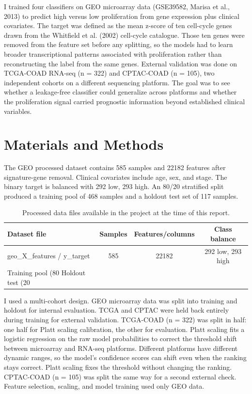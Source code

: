 \documentclass[11pt]{article}
\begin{document}
I trained four classifiers on GEO microarray data (GSE39582, Marisa et al., 2013) to predict high versus low proliferation from gene expression plus clinical covariates. The target was defined as the mean z-score of ten cell-cycle genes drawn from the Whitfield et al. (2002) cell-cycle catalogue. Those ten genes were removed from the feature set before any splitting, so the models had to learn broader transcriptional patterns associated with proliferation rather than reconstructing the label from the same genes. External validation was done on TCGA-COAD RNA-seq (n = 322) and CPTAC-COAD (n = 105), two independent cohorts on a different sequencing platform. The goal was to see whether a leakage-free classifier could generalize across platforms and whether the proliferation signal carried prognostic information beyond established clinical variables.

\section{Materials and Methods}
The GEO processed dataset contains 585 samples and 22182 features after signature-gene removal. Clinical covariates include age, sex, and stage. The binary target is balanced with 292 low, 293 high. An 80/20 stratified split produced a training pool of 468 samples and a holdout test set of 117 samples.

\begin{table}[H]
\centering
\caption{Processed data files available in the project at the time of this report.}
\begin{tabular}{lccc}
\toprule
\textbf{Dataset file} & \textbf{Samples} & \textbf{Features/columns} & \textbf{Class balance} \\
\midrule
  geo_X_features / y_target & 585 & 22182 & 292 low, 293 high \\
  Training pool (80%
  Holdout test (20%
\bottomrule
\end{tabular}
\end{table}

I used a multi-cohort design. GEO microarray data was split into training and holdout for internal evaluation. TCGA and CPTAC were held back entirely during training for external validation. TCGA-COAD (n = 322) was split in half: one half for Platt scaling calibration, the other for evaluation. Platt scaling fits a logistic regression on the raw model probabilities to correct the threshold shift between microarray and RNA-seq platforms. Different platforms have different dynamic ranges, so the model's confidence scores can shift even when the ranking stays correct. Platt scaling fixes the threshold without changing the ranking. CPTAC-COAD (n = 105) was split the same way for a second external check. Feature selection, scaling, and model training used only GEO data.
\end{document}
